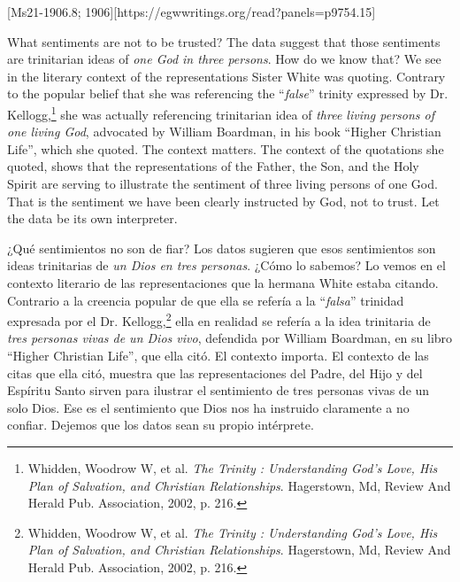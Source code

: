 [Ms21-1906.8; 1906][https://egwwritings.org/read?panels=p9754.15]


What sentiments are not to be trusted? The data suggest that those sentiments are trinitarian ideas of \textit{one God in three persons}. How do we know that? We see in the literary context of the representations Sister White was quoting. Contrary to the popular belief that she was referencing the “\textit{false}” trinity expressed by Dr. Kellogg,\footnote{Whidden, Woodrow W, et al. \textit{The Trinity : Understanding God’s Love, His Plan of Salvation, and Christian Relationships}. Hagerstown, Md, Review And Herald Pub. Association, 2002, p. 216.} she was actually referencing trinitarian idea of \textit{three living persons of one living God}, advocated by William Boardman, in his book “Higher Christian Life”, which she quoted. The context matters. The context of the quotations she quoted, shows that the representations of the Father, the Son, and the Holy Spirit are serving to illustrate the sentiment of three living persons of one God. That is the sentiment we have been clearly instructed by God, not to trust. Let the data be its own interpreter.


¿Qué sentimientos no son de fiar? Los datos sugieren que esos sentimientos son ideas trinitarias de \textit{un Dios en tres personas}. ¿Cómo lo sabemos? Lo vemos en el contexto literario de las representaciones que la hermana White estaba citando. Contrario a la creencia popular de que ella se refería a la “\textit{falsa}” trinidad expresada por el Dr. Kellogg,\footnote{Whidden, Woodrow W, et al. \textit{The Trinity : Understanding God's Love, His Plan of Salvation, and Christian Relationships}. Hagerstown, Md, Review And Herald Pub. Association, 2002, p. 216.} ella en realidad se refería a la idea trinitaria de \textit{tres personas vivas de un Dios vivo}, defendida por William Boardman, en su libro “Higher Christian Life”, que ella citó. El contexto importa. El contexto de las citas que ella citó, muestra que las representaciones del Padre, del Hijo y del Espíritu Santo sirven para ilustrar el sentimiento de tres personas vivas de un solo Dios. Ese es el sentimiento que Dios nos ha instruido claramente a no confiar. Dejemos que los datos sean su propio intérprete.


